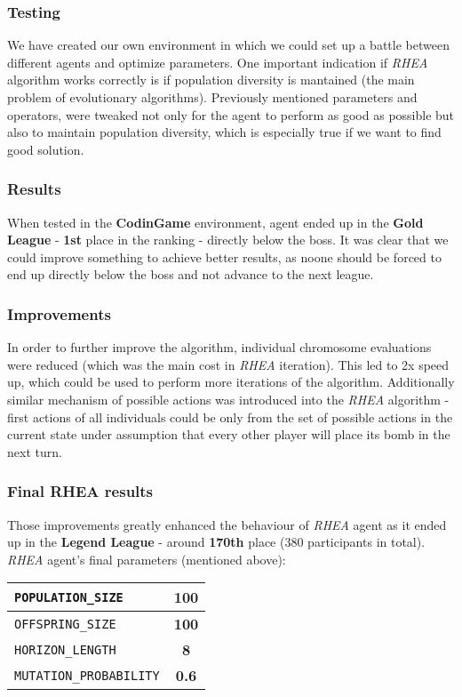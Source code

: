 \documentclass[11pt]{article}
\begin{document}
    \subsubsection*{Testing}
    We have created our own environment in which we could set up a battle between different agents and optimize parameters. One important indication if \textit{RHEA} algorithm works correctly is if population diversity is mantained (the main problem of evolutionary algorithms). Previously mentioned parameters and operators, were tweaked not only for the agent to perform as good as possible but also to maintain population diversity, which is especially true if we want to find good solution.
    
    \subsubsection*{Results}
    When tested in the \textbf{CodinGame} environment, agent ended up in the \textbf{Gold League} - \textbf{1st} place in the ranking - directly below the boss. It was clear that we could improve something to achieve better results, as noone should be forced to end up directly below the boss and not advance to the next league.
    
    \subsubsection*{Improvements}
    In order to further improve the algorithm, individual chromosome evaluations were reduced (which was the main cost in \textit{RHEA} iteration). This led to 2x speed up, which could be used to perform more iterations of the algorithm. Additionally similar mechanism of possible actions was introduced into the \textit{RHEA} algorithm - first actions of all individuals could be only from the set of possible actions in the current state under assumption that every other player will place its bomb in the next turn.

    \subsubsection*{Final RHEA results}
    Those improvements greatly enhanced the behaviour of \textit{RHEA} agent as it ended up in the \textbf{Legend League} - around \textbf{170th} place ($380$ participants in total).
    \newpage
    \textit{RHEA} agent's final parameters (mentioned above):
    \begin{center}
		\begin{tabular}{| l | c |}
			\hline
			\texttt{POPULATION\_SIZE} & \textbf{100} \\ \hline
			\texttt{OFFSPRING\_SIZE} & \textbf{100} \\ \hline
			\texttt{HORIZON\_LENGTH} & \textbf{8} \\ \hline
			\texttt{MUTATION\_PROBABILITY} & \textbf{0.6} \\ \hline
		\end{tabular}
	\end{center}
	
\end{document}
